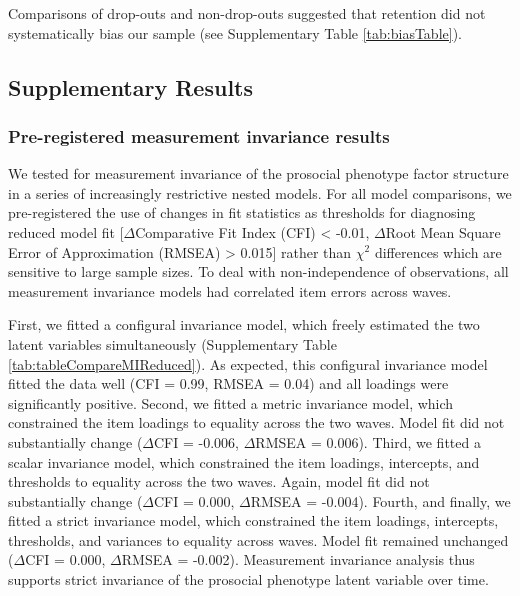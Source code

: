 \documentclass[
  man,floatsintext]{apa6}
\begin{document}
Comparisons of drop-outs and non-drop-outs suggested that retention did not
systematically bias our sample (see Supplementary Table \ref{tab:biasTable}).

\newpage

\hypertarget{supplementary-results}{%
\subsection{Supplementary Results}\label{supplementary-results}}

\hypertarget{pre-registered-measurement-invariance-results}{%
\subsubsection{Pre-registered measurement invariance results}\label{pre-registered-measurement-invariance-results}}

We tested for measurement invariance of the prosocial phenotype factor
structure in a series of increasingly restrictive nested models. For all model
comparisons, we pre-registered the use of changes in fit statistics as
thresholds for diagnosing reduced model fit
{[}\(\Delta\)Comparative Fit Index (CFI) \textless{} -0.01, \(\Delta\)Root Mean Square Error of
Approximation (RMSEA) \textgreater{} 0.015{]} rather than \(\chi^2\) differences which are
sensitive to large sample sizes. To deal with non-independence of observations,
all measurement invariance models had correlated item errors across waves.

First, we fitted a configural invariance model, which freely estimated the two
latent variables simultaneously (Supplementary Table \ref{tab:tableCompareMIReduced}).
As expected, this configural invariance model fitted the data well (CFI =
0.99, RMSEA =
0.04) and all loadings were
significantly positive. Second, we fitted a metric invariance model, which
constrained the item loadings to equality across the two waves. Model fit did
not substantially change (\(\Delta\)CFI =
-0.006,
\(\Delta\)RMSEA =
0.006).
Third, we fitted a scalar invariance model, which constrained the item
loadings, intercepts, and thresholds to equality across the two waves. Again,
model fit did not substantially change (\(\Delta\)CFI =
0.000,
\(\Delta\)RMSEA =
-0.004).
Fourth, and finally, we fitted a strict invariance model, which constrained the
item loadings, intercepts, thresholds, and variances to equality across waves.
Model fit remained unchanged (\(\Delta\)CFI =
0.000,
\(\Delta\)RMSEA =
-0.002).
Measurement invariance analysis thus supports strict invariance of the
prosocial phenotype latent variable over time.
\end{document}
